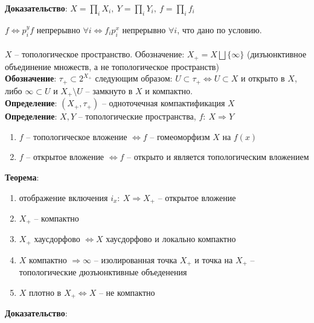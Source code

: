	\textbf{Доказательство}: $X = \prod_i X_i,\ Y = \prod_i Y_i,\ f = \prod_i f_i$\\
	\begin{figure}[h!]
	\end{figure}
	$f \Leftrightarrow p_i^y f$ непрерывно $\forall i \Leftrightarrow f_i p_i^x$ непрерывно $\forall i$, что дано по условию.
	\\
	\\
	$X$ -- топологическое пространство. Обозначение: $X_{+}=X \bigsqcup \{\infty\}$ (дизъюнктивное объединение множеств, а не топологическое  пространств)\\
	\textbf{Обозначение}: ${\tau}_{+}\subset 2^{X_{+}}$ следующим образом: $U\subset \tau_{+} \Leftrightarrow U\subset X$ и открыто в $X$, либо $\infty\subset U$ и $X_{+}\setminus U$ -- замкнуто в $X$ и компактно.\\
	\textbf{Определение}: $(X_{+}, {\tau}_{+})$ -- одноточечная компактификация $X$\\
	\textbf{Определение}: $X, Y$ -- топологические пространства, $f:\ X\Rightarrow Y$\\
	\begin{enumerate}
		\item 
		$f$ -- топологическое вложение $\Leftrightarrow f$ -- гомеоморфизм $X$ на $f(x)$
		\item 
		$f$ -- открытое вложение $\Leftrightarrow f$ -- открыто и является топологическим вложением
	\end{enumerate}
	\textbf{Теорема}: 
	\begin{enumerate}
		\item 
		отображение включения $i_x:\ X\Rightarrow X_{+}$ -- открытое вложение
		\item 
		$X_{+}$ -- компактно
		\item 
		$X_{+}$ хаусдорфово $\Leftrightarrow X$ хаусдорфово и локально компактно
		\item 
		$X$ компактно $\Rightarrow \infty$ -- изолированная точка $X_{+}$ и точка на $X_{+}$ -- топологические дюзъюнктивные объеденения
		\item 
		$X$ плотно в $X_{+} \Leftrightarrow X$ -- не компактно
	\end{enumerate}
	\textbf{Доказательство}: 
